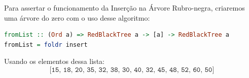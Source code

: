 Para assertar o funcionamento da Inserção na Árvore Rubro-negra, criaremos uma árvore do zero com o uso desse algoritmo:

\begin{lstlisting}[language=haskell]
fromList :: (Ord a) => RedBlackTree a -> [a] -> RedBlackTree a
fromList = foldr insert
\end{lstlisting}
\FloatBarrier

\noindent
Usando os elementos dessa lista:
$$
	\texttt{[15, 18, 20, 35, 32, 38, 30, 40, 32, 45, 48, 52, 60, 50]}
$$
\begin{figure}[!ht]
	\centering
\end{figure}
\FloatBarrier

